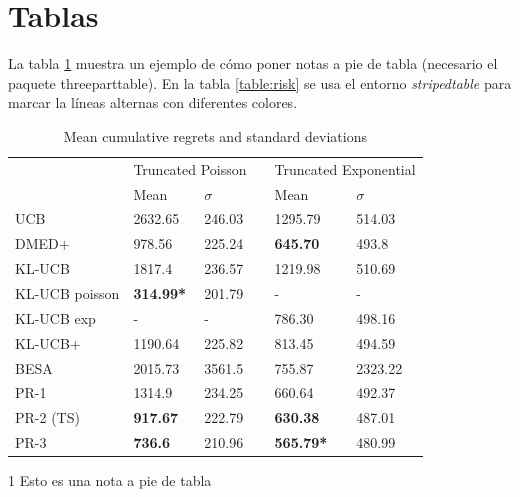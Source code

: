 \section{Tablas}
La tabla \ref{table:results45} muestra un ejemplo de cómo poner notas a pie de tabla (necesario el paquete threeparttable). En la tabla \ref{table:risk} se usa el entorno \textit{stripedtable} para marcar la líneas alternas con diferentes colores.

\begin{table}[htb]
\begin{threeparttable}
	\centering
	\caption{Mean cumulative regrets and standard deviations}
	\label{table:results45}
	\begin{small}
	\begin{tabular}{llllll}
		\toprule
			& \multicolumn{2}{c}{Truncated Poisson} & & \multicolumn{2}{c}{Truncated Exponential} \\
		\cmidrule{2-3}\cmidrule{5-6}
		 	& Mean & $\sigma$ & & Mean & $\sigma$\\ \midrule
		 UCB\tnote{1} & 2632.65 & 246.03 & & 1295.79 & 514.03 \\
		 DMED+ & 978.56 & 225.24 & & \textbf{645.70} & 493.8 \\
		 KL-UCB & 1817.4 & 236.57 & & 1219.98 & 510.69 \\
		 KL-UCB poisson & \textbf{314.99*} & 201.79 & & - & - \\
		 KL-UCB exp & - & - & & 786.30 & 498.16 \\
		 KL-UCB+ & 1190.64 & 225.82 & & 813.45 & 494.59 \\
		 BESA & 2015.73 & 3561.5 & & 755.87 & 2323.22 \\
		 PR-1 & 1314.9 & 234.25 & & 660.64 & 492.37 \\
		 PR-2 (TS) & \textbf{917.67} & 222.79 & & \textbf{630.38} & 487.01 \\
		 PR-3 & \textbf{736.6} & 210.96 & & \textbf{565.79*} & 480.99 \\
		 \bottomrule
	\end{tabular}
	\end{small}
	\begin{tablenotes}
		\item[1] Esto es una nota a pie de tabla
	\end{tablenotes}
\end{threeparttable}
\end{table}


